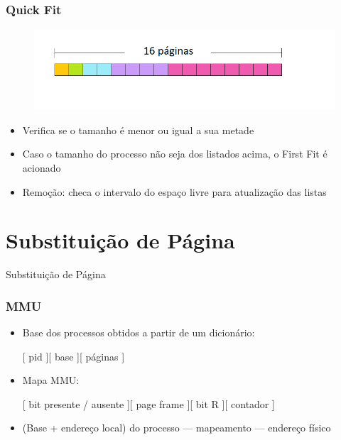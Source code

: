 \documentclass{beamer}
\begin{document}
\begin{frame}
\frametitle{Quick Fit}

\begin{figure}
\centering
\includegraphics[scale=0.6]{imagem4.png}
\end{figure}

\begin{itemize}

\item Verifica se o tamanho é menor ou igual a sua metade

\item Caso o tamanho do processo não seja dos listados acima, o First Fit é acionado

\item Remoção: checa o intervalo do espaço livre para atualização das listas

\end{itemize}

\justifying
\end{frame}



\section{Substituição de Página}
\begin{frame}
\begin{LARGE}
\begin{center}
Substituição de Página
\end{center}
\end{LARGE}
\end{frame}

\begin{frame}
\frametitle{MMU}
\begin{itemize}

\item Base dos processos obtidos a partir de um dicionário: 

[ pid ][ base ][ páginas ]

\item Mapa MMU: 
 
[ bit presente / ausente ][ page frame ][ bit R ][ contador ]

\item (Base + endereço local) do processo --- mapeamento --- endereço físico

\end{itemize}
\justifying
\end{frame}
\end{document}
